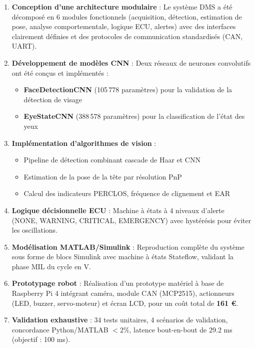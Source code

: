 \begin{enumerate}[leftmargin=2cm]
    \item \textbf{Conception d'une architecture modulaire} : Le système DMS a été décomposé en 6 modules fonctionnels (acquisition, détection, estimation de pose, analyse comportementale, logique ECU, alertes) avec des interfaces clairement définies et des protocoles de communication standardisés (CAN, UART).
    
    \item \textbf{Développement de modèles CNN} : Deux réseaux de neurones convolutifs ont été conçus et implémentés :
    \begin{itemize}
        \item \textbf{FaceDetectionCNN} (105\,778 paramètres) pour la validation de la détection de visage
        \item \textbf{EyeStateCNN} (388\,578 paramètres) pour la classification de l'état des yeux
    \end{itemize}
    
    \item \textbf{Implémentation d'algorithmes de vision} :
    \begin{itemize}
        \item Pipeline de détection combinant cascade de Haar et CNN
        \item Estimation de la pose de la tête par résolution PnP
        \item Calcul des indicateurs PERCLOS, fréquence de clignement et EAR
    \end{itemize}
    
    \item \textbf{Logique décisionnelle ECU} : Machine à états à 4 niveaux d'alerte (NONE, WARNING, CRITICAL, EMERGENCY) avec hystérésis pour éviter les oscillations.
    
    \item \textbf{Modélisation MATLAB/Simulink} : Reproduction complète du système sous forme de blocs Simulink avec machine à états Stateflow, validant la phase MIL du cycle en V.
    
    \item \textbf{Prototypage robot} : Réalisation d'un prototype matériel à base de Raspberry Pi 4 intégrant caméra, module CAN (MCP2515), actionneurs (LED, buzzer, servo-moteur) et écran LCD, pour un coût total de \textbf{161 €}.
    
    \item \textbf{Validation exhaustive} : 34 tests unitaires, 4 scénarios de validation, concordance Python/MATLAB $< 2\%$, latence bout-en-bout de 29.2 ms (objectif : 100 ms).
\end{enumerate}

